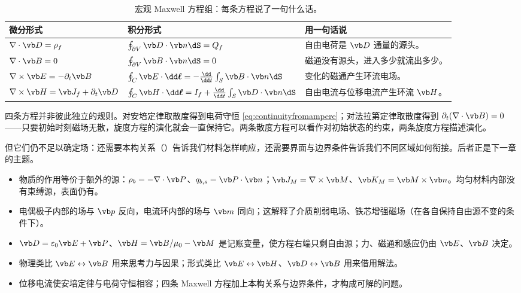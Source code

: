 \begin{table}[htbp]\centering\small
\caption{宏观 Maxwell 方程组：每条方程说了一句什么话。}\label{tab:maxwell}
\begin{tabularx}{\linewidth}{@{}l l Y@{}}
\toprule
微分形式 & 积分形式 & 用一句话说\\\midrule
$\nabla\cdot\vb D=\rho_f$ & $\oint_{\partial V}\vb D\cdot\vb n\dS=Q_f$ & 自由电荷是 $\vb D$ 通量的源头。\\
$\nabla\cdot\vb B=0$ & $\oint_{\partial V}\vb B\cdot\vb n\dS=0$ & 磁通没有源头，进入多少就流出多少。\\
$\nabla\times\vb E=-\partial_t\vb B$ & $\oint_C\vb E\cdot\dd\boldsymbol\ell=-\frac{\dd}{\dd t}\int_S\vb B\cdot\vb n\dS$ & 变化的磁通产生环流电场。\\
$\nabla\times\vb H=\vb J_f+\partial_t\vb D$ & $\oint_C\vb H\cdot\dd\boldsymbol\ell=I_f+\frac{\dd}{\dd t}\int_S\vb D\cdot\vb n\dS$ & 自由电流与位移电流产生环流 $\vb H$。\\
\bottomrule
\end{tabularx}
\end{table}

四条方程并非彼此独立的规则。对安培定律取散度得到电荷守恒 \eqref{eq:continuityfromampere}；对法拉第定律取散度得到 $\partial_t(\nabla\cdot\vb B)=0$——只要初始时刻磁场无散，旋度方程的演化就会一直保持它。两条散度方程可以看作对初始状态的约束，两条旋度方程描述演化。

但它们仍不足以确定场：还需要本构关系（）告诉我们材料怎样响应，还需要界面与边界条件告诉我们不同区域如何衔接。后者正是下一章的主题。

\begin{takeaways}
\begin{itemize}
\item 物质的作用等价于额外的源：$\rho_b=-\nabla\cdot\vb P$、$q_{b,s}=\vb P\cdot\vb n$；$\vb J_M=\nabla\times\vb M$、$\vb K_M=\vb M\times\vb n$。均匀材料内部没有束缚源，表面仍有。
\item 电偶极子内部的场与 $\vb p$ 反向，电流环内部的场与 $\vb m$ 同向；这解释了介质削弱电场、铁芯增强磁场（在各自保持自由源不变的条件下）。
\item $\vb D=\varepsilon_0\vb E+\vb P$、$\vb H=\vb B/\mu_0-\vb M$ 是记账变量，使方程右端只剩自由源；力、磁通和感应仍由 $\vb E$、$\vb B$ 决定。
\item 物理类比 $\vb E\leftrightarrow\vb B$ 用来思考力与因果；形式类比 $\vb E\leftrightarrow\vb H$、$\vb D\leftrightarrow\vb B$ 用来借用解法。
\item 位移电流使安培定律与电荷守恒相容；四条 Maxwell 方程加上本构关系与边界条件，才构成可解的问题。
\end{itemize}
\end{takeaways}

